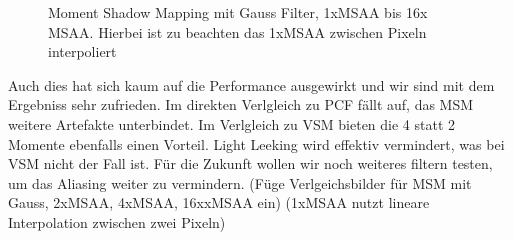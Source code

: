 \documentclass[runningheaders,a4paper]{llncs}
\begin{document}
\begin{figure}[H]
	\centering
	
	\caption{Moment Shadow Mapping mit Gauss Filter, 1xMSAA bis 16x MSAA. Hierbei ist zu beachten das 1xMSAA zwischen Pixeln interpoliert}
\end{figure}

Auch dies hat sich kaum auf die Performance ausgewirkt und wir sind mit dem Ergebniss sehr zufrieden.
Im direkten Verlgleich zu PCF fällt auf, das MSM weitere Artefakte unterbindet. Im Verlgleich zu VSM bieten die 4 statt 2 Momente ebenfalls einen Vorteil. Light Leeking wird effektiv vermindert, was bei VSM nicht der Fall ist.
Für die Zukunft wollen wir noch weiteres filtern testen, um das Aliasing weiter zu vermindern.
(Füge Verlgeichsbilder für MSM mit Gauss, 2xMSAA, 4xMSAA, 16xxMSAA ein)
(1xMSAA nutzt lineare Interpolation zwischen zwei Pixeln)
\end{document}
